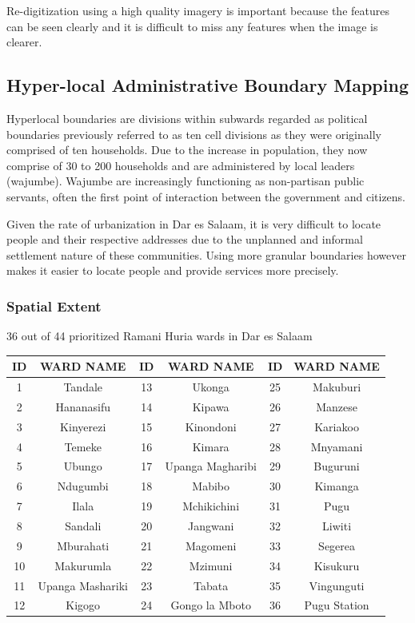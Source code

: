 \documentclass[a4paper,12pt,twoside]{article}
\begin{document}
Re-digitization using a high quality imagery is important because the features can be seen clearly and it is difficult to miss any features when the image is clearer.

\newpage
\subsection{Hyper-local Administrative Boundary Mapping}
Hyperlocal boundaries are divisions within subwards regarded as political boundaries previously referred to as ten cell divisions as they were originally comprised of ten households.
Due to the increase in population, they now comprise of 30 to 200 households and are administered by local leaders (wajumbe). Wajumbe are increasingly functioning as non-partisan public servants, often the first point of interaction between the government and citizens.

Given the rate of urbanization in Dar es Salaam, it is very difficult to locate people and their respective addresses due to the unplanned and informal settlement nature of these   communities. Using more granular boundaries however makes it easier to locate people and provide services more precisely.  

\subsubsection{Spatial Extent}
36 out of 44 prioritized Ramani Huria wards in Dar es Salaam

\begin{center}
\begin{tabular}{|c|c|c|c|c|c|}
\hline
ID & WARD NAME & ID & WARD NAME & ID & WARD NAME\\
\hline
1  &  Tandale &  13 &   Ukonga &  25  &  Makuburi\\
2  &  Hananasifu &  14  &  Kipawa &  26  &  Manzese\\
3  &  Kinyerezi &  15  &  Kinondoni &  27  &  Kariakoo\\
4 &  Temeke &  16  &  Kimara &  28  &  Mnyamani\\
5  &  Ubungo &  17  &  Upanga Magharibi &  29  &  Buguruni\\
6 &   Ndugumbi &  18  &  Mabibo &  30  &  Kimanga\\
7 &   Ilala &  19  &  Mchikichini &  31  &  Pugu\\
8 &   Sandali &  20  &  Jangwani &  32  &  Liwiti\\
9  &  Mburahati &  21  &  Magomeni &  33  &  Segerea\\
10  &  Makurumla &  22  &  Mzimuni &  34  &  Kisukuru\\
11  &  Upanga Mashariki &  23  &  Tabata &  35  &  Vingunguti\\
12  &  Kigogo &  24  &  Gongo la Mboto &  36  & Pugu Station\\
 \hline
\end{tabular}
\end{center}
\end{document}
